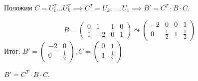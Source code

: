 \documentclass[a4paper]{article}
\begin{document}
\begin{colloq}
            Положим $C = U^{T}_{1} \dots U^{T}_{k} \implies C^{T} = U_{k}, \dots , U_{1} \implies B' = C^{T} \cdot B \cdot C $.

            \begin{comment}
                Матрицу C можно вычислить модифицировав алгоритм. Припишем единичную матрицу E справа от B и будем выполнять с ней только элементарные преобразования строк.
                \begin{equation}
                    (B \mid E) \leadsto (B' \mid P), P = U_{k} \dots U_{2} U_{1} = C^{T} \implies C = P^{T}
                \end{equation}
            \end{comment}

            \begin{example}
                \begin{equation*}
                    B = \left(
                        \begin{array}{cc|cc} 
                            0 & 1 & 1 & 0 \\ 
                            1 & -2 & 0 & 1
                        \end{array} 
                    \right) \leadsto
                    \left(
                        \begin{array}{cc|cc}
                            -2 & 0 & 0 & 1 \\
                            0 & \frac{1}{2} & 1 & \frac{1}{2}
                        \end{array}
                    \right)
                \end{equation*}
                Итог: $B' = \begin{pmatrix} -2 & 0 \\ 0 & \frac{1}{2} \end{pmatrix}, C = \begin{pmatrix} 0 & 1 \\ 1 & \frac{1}{2} \end{pmatrix}$

                $B' = C^{T} \cdot B \cdot C$.
            \end{example}

            \begin{comment}
                Базис $\E'$ в котором матрица билинейного отображения $\beta$ имеет диагональный вид, а также сам этот вид определены неоднозначно.
            \end{comment}



\end{colloq}
\end{document}
